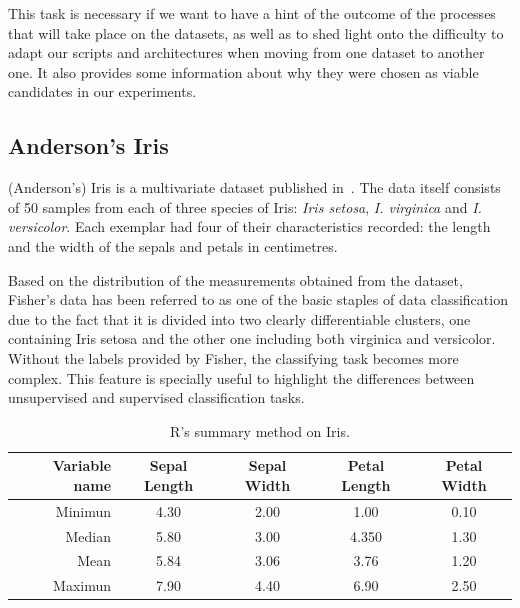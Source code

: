 This task is necessary if we want to have a hint of the outcome of the processes that will take place on the datasets, as well as to shed  light onto the difficulty to adapt our scripts and architectures when moving from one dataset to another one. It also provides some information about why they were chosen as viable candidates in our experiments.

 

\subsection{Anderson's Iris}

(Anderson's) Iris is a multivariate dataset published in~\cite{Fisher_Iris}. The data itself consists of 50 samples from each of three species of Iris: \emph{Iris setosa}, \emph{I. virginica} and \emph{I. versicolor}. Each exemplar had four of their characteristics recorded: the length and the width of the sepals and petals in centimetres. \par

Based on the distribution of the measurements obtained from the dataset, Fisher's data has been referred to as one of the basic staples of data classification due to the fact that it is divided into two clearly differentiable clusters, one containing Iris setosa and the other one including both virginica and versicolor. Without the labels provided by Fisher, the classifying task becomes more complex. This feature is specially useful to highlight the differences between unsupervised and supervised classification tasks. %
% 
\begin{table}[H]
		\caption{R's summary method on Iris.}
	\begin{center}
	\label{tab:table_Iris}
		\begin{tabular}{r|c|c|c|c} %
			\textbf{Variable name} & \textbf{Sepal Length} & \textbf{Sepal Width} & \textbf{Petal Length} & \textbf{Petal Width}\\
			\hline
			Minimun & 4.30 & 2.00 & 1.00 & 0.10\\
			Median & 5.80 & 3.00 & 4.350 & 1.30\\
			Mean & 5.84 & 3.06 & 3.76 & 1.20\\
			Maximun & 7.90 & 4.40 & 6.90 & 2.50\\
		\end{tabular}
	\end{center}
\end{table}

